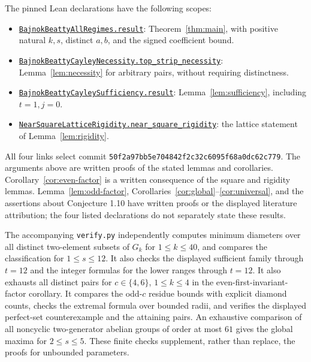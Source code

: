 \documentclass[11pt]{article}
\newcommand{\Gk}{G_k}
\newcommand{\proofurl}{https://github.com/the-omega-institute/trureturing/blob/50f2a97bb5e704842f2c32c6095f68a0dc62c779/D5/S3/FiniteGroups/}
\begin{document}
The pinned Lean declarations have the following scopes:
\begin{itemize}
\item \href{\proofurl BajnokBeattyAllRegimes.lean}{\texttt{BajnokBeattyAllRegimes.result}}:
Theorem~\ref{thm:main}, with positive natural $k,s$, distinct $a,b$,
and the signed coefficient bound.
\item \href{\proofurl BajnokBeattyCayleyNecessity.lean}{\texttt{BajnokBeattyCayleyNecessity.}\allowbreak\texttt{top\_strip\_necessity}}:\newline
Lemma~\ref{lem:necessity} for arbitrary pairs, without requiring distinctness.
\item \href{\proofurl BajnokBeattyCayleySufficiency.lean}{\texttt{BajnokBeattyCayleySufficiency.}\allowbreak\texttt{result}}:
Lemma~\ref{lem:sufficiency}, including $t=1,j=0$.
\item \href{\proofurl NearSquareLatticeRigidity.lean}{\texttt{NearSquareLatticeRigidity.}\allowbreak\texttt{near\_square\_rigidity}}:
the lattice statement of Lemma~\ref{lem:rigidity}.
\end{itemize}
All four links select commit
\texttt{50f2a97bb5e704842f2c32c6095f68a0dc62c779}.
The arguments above are written proofs of the stated lemmas and corollaries.
Corollary~\ref{cor:even-factor} is a written consequence of the square and
rigidity lemmas. Lemma~\ref{lem:odd-factor},
Corollaries~\ref{cor:global}--\ref{cor:universal}, and the assertions about
Conjecture 1.10 have written proofs or the displayed literature attribution;
the four listed declarations do not separately state these results.

The accompanying \texttt{verify.py} independently computes minimum diameters
over all distinct two-element subsets of $\Gk$ for $1\le k\le40$,
and compares the classification for $1\le s\le12$.
It also checks the displayed sufficient family through $t=12$ and the
integer formulas for the lower ranges through $t=12$.
It also exhausts all distinct pairs for $c\in\{4,6\}$, $1\le k\le4$
in the even-first-invariant-factor corollary.
It compares the odd-$c$ residue bounds with explicit diamond counts,
checks the extremal formula over bounded radii, and verifies the displayed
perfect-set counterexample and the attaining pairs.
An exhaustive comparison of all noncyclic two-generator abelian groups
of order at most $61$ gives the global maxima for $2\le s\le5$.
These finite checks supplement, rather than replace, the proofs for
unbounded parameters.
\end{document}
